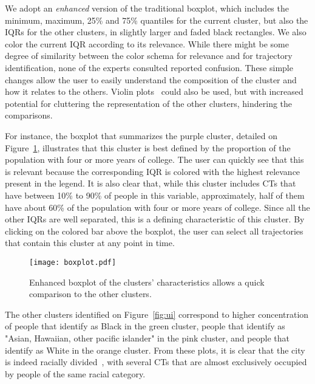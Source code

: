 We adopt an \emph{enhanced} version of the traditional boxplot, which includes
the minimum, maximum, 25\% and 75\% quantiles for the current cluster, but also
the IQRs for the other clusters, in slightly larger and faded black rectangles.
We also color the current IQR according to its relevance. While there might be
some degree of similarity between the color schema for relevance and for
trajectory identification, none of the experts consulted reported confusion.
These simple changes allow the user to easily understand the composition of the
cluster and how it relates to the others. Violin plots~\cite{hintze1998violin}
could also be used, but with increased potential for cluttering the
representation of the other clusters, hindering the comparisons.


For instance, the boxplot that summarizes the purple cluster, detailed on
Figure~\ref{fig:boxplot}, illustrates that this cluster is best defined by the
proportion of the population with four or more years of college. The user can
quickly see that this is relevant because the corresponding IQR is colored with
the highest relevance present in the legend. It is also clear that, while this
cluster includes CTs that have between 10\% to 90\% of people in this variable,
approximately, half of them have about 60\% of the population with four or more
years of college. Since all the other IQRs are well separated, this is a
defining characteristic of this cluster. By clicking on the colored bar above
the boxplot, the user can select all trajectories that contain this cluster at
any point in time.

\begin{figure}
    \centering 
    \texttt{[image: boxplot.pdf]}
    \caption{Enhanced boxplot of the clusters' characteristics allows a quick
    comparison to the other clusters.\label{fig:boxplot}}
\end{figure}


The other clusters identified on Figure~\ref{fig:ui} correspond to higher
concentration of people that identify as Black in the green cluster, people that
identify as "Asian, Hawaiian, other pacific islander" in the pink cluster, and
people that identify as White in the orange cluster. From these plots, it is
clear that the city is indeed racially divided~\cite{Delmelle2016}, with several
CTs that are almost exclusively occupied by people of the same racial category.


